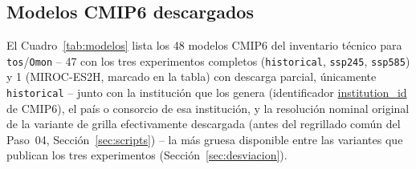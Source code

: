\documentclass[11pt,a4paper]{article}
\newcommand{\archivo}[1]{\begingroup\hypersetup{urlcolor=black}\url{#1}\endgroup}
\begin{document}
\subsection{Modelos CMIP6 descargados}
\label{sec:tabla_modelos}

El Cuadro~\ref{tab:modelos} lista los 48 modelos CMIP6 del inventario t\'ecnico para \texttt{tos}/\texttt{Omon} -- 47 con los tres experimentos completos (\texttt{historical}, \texttt{ssp245}, \texttt{ssp585}) y 1 (MIROC-ES2H, marcado en la tabla) con descarga parcial, \'unicamente \texttt{historical} -- junto con la instituci\'on que los genera (identificador \archivo{institution_id} de CMIP6), el pa\'is o consorcio de esa instituci\'on, y la resoluci\'on nominal original de la variante de grilla efectivamente descargada (antes del regrillado com\'un del Paso~04, Secci\'on~\ref{sec:scripts}) -- la m\'as gruesa disponible entre las variantes que publican los tres experimentos (Secci\'on~\ref{sec:desviacion}).
\end{document}
